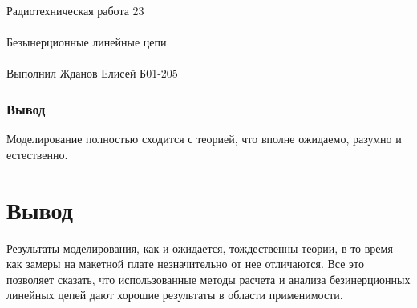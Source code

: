 \documentclass{astroedu-lab}
\begin{document}
\begin{problem}{\huge Радиотехническая работа 23\\\\Безынерционные линейные цепи\\\\Выполнил Жданов Елисей Б01-205}
\subsubsection{Вывод}

Моделирование полностью сходится с теорией, что вполне ожидаемо, разумно и естественно.

\section{Вывод}

Результаты моделирования, как и ожидается, тождественны теории, в то время как замеры на макетной плате незначительно от нее отличаются. Все это позволяет сказать, что использованные методы расчета и анализа безинерционных линейных цепей дают хорошие результаты в области применимости.


\end{problem}
\end{document}
